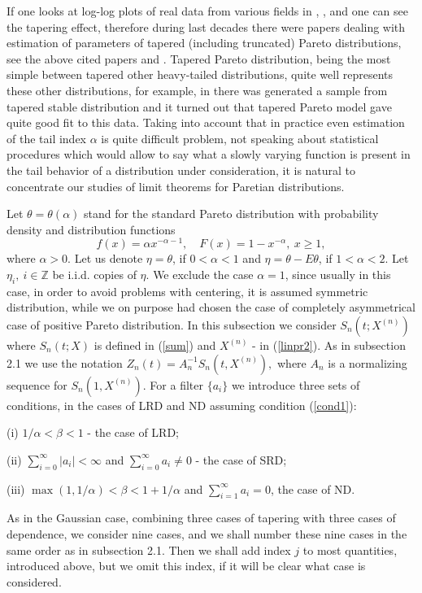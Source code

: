 \documentclass[12pt]{article}
\def\bz{{\bf Z}}
\def\bz{{\mathbb Z}} %
\def\a{\alpha}
\def\b{\beta}
\theoremstyle{plain}
\theoremstyle{definition}
\begin{document}
If one looks at log-log plots of real data from various fields in \cite{Kagan}, \cite{Aban}, and \cite{Meerschaert} one can see the tapering effect, therefore during last decades there were papers dealing with estimation of parameters of  tapered (including truncated) Pareto distributions, see the above cited papers \cite{Aban} and \cite{Meerschaert}. Tapered Pareto distribution, being the most simple between tapered other heavy-tailed distributions, quite well represents these other distributions, for example, in \cite{Meerschaert} there was generated  a sample from tapered  stable distribution and it turned out that tapered Pareto model gave quite good fit to this data.
Taking into account that in practice even estimation of the tail index $\a$ is quite difficult problem, not speaking about statistical procedures which would allow to say what a slowly varying function is present in the tail behavior of a distribution under consideration, it is natural to concentrate our studies of limit theorems for Paretian distributions.

Let $\theta =\theta (\a)$ stand for  the standard Pareto distribution with probability density and distribution functions
 \begin{equation}\label{paretodf}
f(x)= \a  x^{-\a-1}, \quad F(x)=1-x^{-\a}, \ x\ge 1,
\end{equation}
where $\a>0$. Let us denote $\eta=\theta$, if $0<\a<1$ and $\eta=\theta -E\theta$, if $1<\a<2$. Let $\eta_i, \ i\in \bz$ be i.i.d. copies of $\eta$. We exclude the case $\a=1$, since usually in this case, in order to avoid problems with centering, it is assumed symmetric distribution, while we on purpose had chosen the case of completely asymmetrical case of positive Pareto distribution.
In this subsection we consider $S_{n}(t; X^{(n)})$ where $S_{n}(t; X)$ is defined in (\ref{sum}) and $ X^{(n)}$ - in (\ref{linpr2}). As in subsection 2.1 we use the notation $Z_n(t)=A_n^{-1} S_n(t, X^{(n)} ),$ where $A_n$ is a normalizing sequence for $ S_n(1, X^{(n)})$.
 For a filter $\{a_i\}$ we introduce three sets of conditions, in the cases of LRD and ND  assuming condition (\ref{cond1}):

(i) $1/\a<\b<1$ - the case of LRD;

 (ii) $\sum_{i=0}^\infty |a_i|<\infty$ and  $\sum_{i=0}^\infty a_i\ne 0$ - the case of SRD;

 (iii) $\max (1, 1/\a)<\b<1+1/\a$ and $\sum_{i=1}^\infty a_i=0$, the case of ND.

As in the Gaussian case, combining three cases of tapering with three cases of dependence,  we  consider nine cases, and we shall number these nine cases in the same order as in subsection 2.1.
Then we shall add index $j$ to most quantities, introduced above, but we omit this index, if it will be clear what case is considered.
\end{document}
